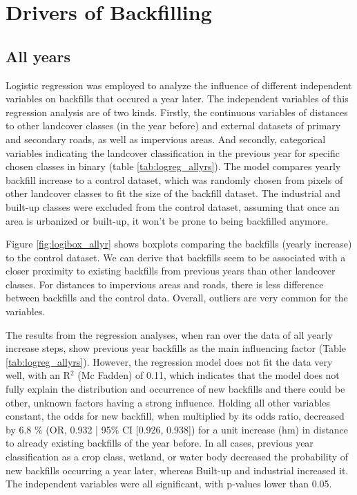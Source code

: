 \documentclass[11pt, A4, oneside]{report}
\begin{document}
\section{Drivers of Backfilling} 
\subsection{All years}
Logistic regression was employed to analyze the influence of different independent variables  on backfills that occured a year later. The independent variables of this regression analysis are of two kinds. Firstly, the continuous variables of distances to other landcover classes (in the year before) and external datasets of primary and secondary roads, as well as impervious areas. And secondly,  categorical variables indicating the landcover classification in the previous year for specific chosen classes in binary (table \ref{tab:logreg_allyrs}). The model compares yearly backfill increase to a control dataset, which was randomly chosen from pixels of other landcover classes to fit the size of the backfill dataset. The industrial and built-up classes were excluded from the control dataset, assuming that once an area is urbanized or built-up, it won't be prone to being backfilled anymore.

Figure \ref{fig:logibox_allyr} shows boxplots comparing the backfills (yearly increase) to the control dataset. We can derive that backfills seem to be associated with a closer proximity to existing backfills from previous years than other landcover classes. For distances to impervious areas and roads, there is less difference between backfills  and the control data. Overall, outliers are very common for the variables. 

The results from the regression analyses, when ran over the data of all yearly increase steps, show previous year backfills as the main influencing factor (Table \ref{tab:logreg_allyrs}). However, the regression model does not fit the data very well, with an R$^2$ (Mc Fadden) of 0.11, which indicates that the model does not fully explain  the distribution and occurrence of new backfills and there could be other, unknown factors having a strong influence. Holding all other variables constant, the odds for new backfill, when multiplied by its odds ratio, decreased by 6.8 \% (OR, 0.932 | 95\% CI [0.926, 0.938]) for a unit increase (hm) in distance to already existing backfills of the year before. In all cases, previous year classification as a crop class, wetland, or water body decreased the probability of new backfills occurring a year later, whereas Built-up and industrial increased it. The independent variables were all significant, with p-values lower than 0.05.
\end{document}
